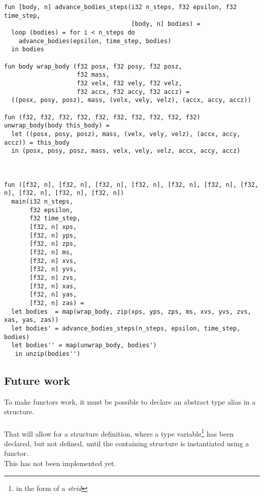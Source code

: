 \begin{lstlisting}
fun [body, n] advance_bodies_steps(i32 n_steps, f32 epsilon, f32 time_step,
                                   [body, n] bodies) =
  loop (bodies) = for i < n_steps do
    advance_bodies(epsilon, time_step, bodies)
  in bodies

fun body wrap_body (f32 posx, f32 posy, f32 posz,
                    f32 mass,
                    f32 velx, f32 vely, f32 velz,
                    f32 accx, f32 accy, f32 accz) =
  ((posx, posy, posz), mass, (velx, vely, velz), (accx, accy, accz))

fun (f32, f32, f32, f32, f32, f32, f32, f32, f32, f32) unwrap_body(body this_body) =
  let ((posx, posy, posz), mass, (velx, vely, velz), (accx, accy, accz)) = this_body
  in (posx, posy, posz, mass, velx, vely, velz, accx, accy, accz)



fun ([f32, n], [f32, n], [f32, n], [f32, n], [f32, n], [f32, n], [f32, n], [f32, n], [f32, n], [f32, n])
  main(i32 n_steps,
       f32 epsilon,
       f32 time_step,
       [f32, n] xps,
       [f32, n] yps,
       [f32, n] zps,
       [f32, n] ms,
       [f32, n] xvs,
       [f32, n] yvs,
       [f32, n] zvs,
       [f32, n] xas,
       [f32, n] yas,
       [f32, n] zas) =
  let bodies  = map(wrap_body, zip(xps, yps, zps, ms, xvs, yvs, zvs, xas, yas, zas))
  let bodies' = advance_bodies_steps(n_steps, epsilon, time_step, bodies)
  let bodies'' = map(unwrap_body, bodies')
   in unzip(bodies'')
\end{lstlisting}
\subsection{Future work}
To make functors work, it must be possible to declare an abstract type alias in
a structure.\\
\\
That will allow for a structure definition, where a type variable\footnote{in the form of a \textit{strid}} has been declared, but not defined, until the containing structure is instantiated using a functor.
\\
This has not been implemented yet.
\clearpage